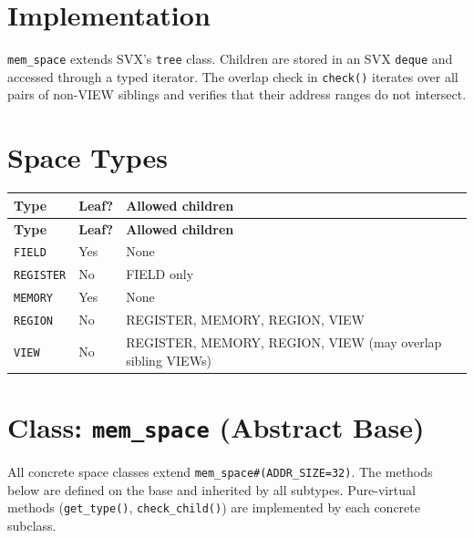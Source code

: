 \documentclass[11pt,letterpaper]{report}
\begin{document}
\section*{Implementation}

\texttt{mem\_space} extends SVX's \texttt{tree} class.  Children are
stored in an SVX \texttt{deque} and accessed through a typed iterator.
The overlap check in \texttt{check()} iterates over all pairs of
non-VIEW siblings and verifies that their address ranges do not
intersect.

\section{Space Types}

\begin{xltabular}{\linewidth}{llX}
\toprule
\textbf{Type} & \textbf{Leaf?} & \textbf{Allowed children} \\
\midrule
\endfirsthead
\toprule
\textbf{Type} & \textbf{Leaf?} & \textbf{Allowed children} \\
\midrule
\endhead
\bottomrule
\endlastfoot
\texttt{FIELD} & Yes & None \\
\texttt{REGISTER} & No & FIELD only \\
\texttt{MEMORY} & Yes & None \\
\texttt{REGION} & No & REGISTER, MEMORY, REGION, VIEW \\
\texttt{VIEW} & No & REGISTER, MEMORY, REGION, VIEW (may overlap sibling VIEWs) \\
\end{xltabular}

\section{Class: \texttt{mem\_space} (Abstract Base)}

All concrete space classes extend \texttt{mem\_space\#(ADDR\_SIZE=32)}. The methods below are defined on the base and inherited by all subtypes. Pure-virtual methods (\texttt{get\_type()}, \texttt{check\_child()}) are implemented by each concrete subclass.
\end{document}
